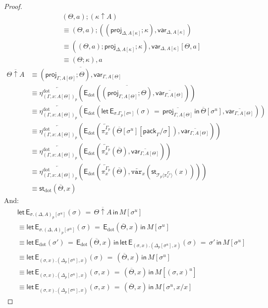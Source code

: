 \documentclass[10pt]{article}
\theoremstyle{definition}
\newcommand{\rewrite}[2]{\overleftarrow{#1}(#2)}
\newcommand\StI[2]{\ensuremath{\mathsf{st}_{#1}(#2)}}
\newcommand\EEs[4]{\ensuremath{\mathsf{let} \, \mathsf{E}_{#1}(#3) \, = \, {#2} \, \mathsf{in} \, #4}}
\newcommand\EIs[2]{\ensuremath{\mathsf{E}_{#1}{(#2)}}}
\newcommand\ApEl[2]{\mathcal{T}_{#1}\langle#2\rangle}
\newcommand\pack[1]{\ensuremath{\mathsf{pack}_{#1}}}
\newcommand\unp[2]{\ensuremath{{#2}^u}}
\newcommand{\modeof}[1]{{#1}_p}
\newcommand{\sdot}{\ensuremath{\mathrm{dot}}}
\newcommand{\upstairs}[1]{\overline{#1}}
\newcommand\proj[1]{\ensuremath{\mathsf{proj}_{#1}}}
\newcommand\qvar[1]{\ensuremath{\mathsf{var}_{#1}}}
\newcommand\var[1]{\ensuremath{\mathtt{var}_{#1}}}
\begin{document}
\begin{proof}
\begin{align*}
&(\Theta, a);(\kappa \uparrow A) \\
&\equiv (\Theta,a);((\proj{\Delta, A[\kappa]}; \kappa) , \qvar{\Delta, A[\kappa]}) \\
&\equiv ((\Theta, a);\proj{\Delta, A[\kappa]}; \kappa) , \qvar{\Delta, A[\kappa]}[\Theta,a] \\
&\equiv (\Theta;\kappa) , a
\end{align*}
\begin{align*}
\upstairs{\Theta \uparrow A} 
&\equiv \upstairs{(\proj{\Gamma, A[\Theta]}; \Theta) , \qvar{\Gamma, A[\Theta]}} \\
&\equiv \rewrite{\eta^\sdot_{\modeof{(\Gamma, x : A[\Theta])}}}{\EIs{\sdot}{\upstairs{(\proj{\Gamma, A[\Theta]}; \Theta)}, \upstairs{\qvar{\Gamma,A[\Theta]}}}} \\
&\equiv \rewrite{\eta^\sdot_{\modeof{(\Gamma, x : A[\Theta])}}}{\EIs{\sdot}{\EEs{\sigma.\modeof{\Gamma}[\unp{\Gamma}{\sigma}]}{\upstairs{\proj{\Gamma, A[\Theta]}}}{\sigma}{\upstairs{\Theta}[\unp{\upstairs{\Gamma}}{\sigma}]}, \upstairs{\qvar{\Gamma,A[\Theta]}}}} \\
&\equiv \rewrite{\eta^\sdot_{\modeof{(\Gamma, x : A[\Theta])}}}{\EIs{\sdot}{\rewrite{\pi^{\modeof{\Gamma}}_x}{\upstairs{\Theta}[\unp{\upstairs{\Gamma}}{\sigma}][\pack{\Gamma}/\sigma]}, \upstairs{\qvar{\Gamma,A[\Theta]}}}} \\
&\equiv \rewrite{\eta^\sdot_{\modeof{(\Gamma, x : A[\Theta])}}}{\EIs{\sdot}{\rewrite{\pi^{\modeof{\Gamma}}_x}{\upstairs{\Theta}}, \upstairs{\qvar{\Gamma,A[\Theta]}}}} \\
&\equiv \rewrite{\eta^\sdot_{\modeof{(\Gamma, x : A[\Theta])}}}{\EIs{\sdot}{\rewrite{\pi^{\modeof{\Gamma}}_x}{\upstairs{\Theta}},  \rewrite{\var{x}}{\StI{\ApEl{p}{\pi^{\modeof{\Gamma}}_x}}{x}}}} \\
&\equiv \StI{\sdot}{\upstairs{\Theta}, x}
\end{align*}
And:
\begin{align*}
&\EEs{\sigma.\modeof{(\Delta,A)}[\unp{\Delta,A}{\sigma}]}{\upstairs{\Theta \uparrow A}}{\sigma}{M[\unp{\Delta, A}{\sigma}]} \\
&\equiv \EEs{\sigma.\modeof{(\Delta,A)}[\unp{\Delta,A}{\sigma}]}{\EIs{\sdot}{\upstairs{\Theta}, x}}{\sigma}{M[\unp{\Delta, A}{\sigma}]} \\
&\equiv \EEs{\sdot}{\EIs{\sdot}{\upstairs{\Theta}, x}}{\sigma'}{\EEs{(\sigma, x). (\modeof{\Delta}[\unp{\Delta}{\sigma}], x)}{\sigma'}{\sigma}{M[\unp{\Delta, A}{\sigma}]}} \\
&\equiv \EEs{(\sigma, x). (\modeof{\Delta}[\unp{\Delta}{\sigma}], x)}{(\upstairs{\Theta}, x)}{\sigma}{M[\unp{\Delta, A}{\sigma}]} \\
&\equiv \EEs{(\sigma, x). (\modeof{\Delta}[\unp{\Delta}{\sigma}], x)}{(\upstairs{\Theta}, x)}{\sigma, x}{M[\unp{\Delta, A}{(\sigma, x)}]} \\
&\equiv \EEs{(\sigma, x). (\modeof{\Delta}[\unp{\Delta}{\sigma}], x)}{(\upstairs{\Theta}, x)}{\sigma, x}{M[\unp{\Delta}{\sigma}, x/x]}
\end{align*}
\end{proof}
\end{document}
